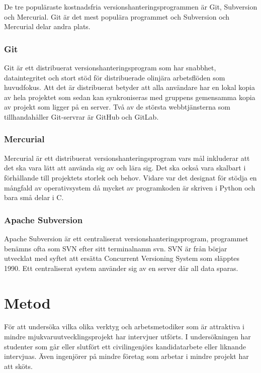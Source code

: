 De tre populäraste kostnadsfria versionshanteringsprogrammen är Git, Subversion och Mercurial. Git är det mest populära programmet och Subversion och Mercurial delar andra plats.\cite{version_comp}
\subsubsection{Git}
Git är ett distribuerat versionshanteringsprogram som har snabbhet, dataintegritet och stort stöd för distribuerade olinjära arbetsflöden som huvudfokus. Att det är distribuerat betyder att alla användare har en lokal kopia av hela projektet som sedan kan synkroniseras med gruppens gemensamma kopia av projekt som ligger på en server. Två av de största webbtjänsterna som tillhandahåller Git-servrar är GitHub och GitLab.\cite{VersionControlGit}\cite{web_Git}

\subsubsection{Mercurial}
Mercurial är ett distribuerat versionshanteringsprogram vars mål inkluderar att det ska vara lätt att använda sig av och lära sig. Det ska också vara skalbart i förhållande till projektets storlek och behov. Vidare var det designat för stödja en mångfald av operativsystem då mycket av programkoden är skriven i Python och bara små delar i C.
\cite{VersionControlMercurial}\cite{VersionControlMercurial}


\subsubsection{Apache Subversion}
Apache Subversion är ett centraliserat versionshanteringsprogram, programmet benämns ofta som SVN efter sitt terminalnamn svn. SVN är från börjar utvecklat med syftet att ersätta Concurrent Versioning System som släpptes 1990. Ett centraliserat system använder sig av en server där all data sparas.\cite{wiki_cvs}\cite{VersionControlSvn}\cite{web_Svn}


\section{Metod}
För att undersöka vilka olika verktyg och arbetsmetodiker som är attraktiva i mindre mjukvaruutvecklingsprojekt har intervjuer utförts. I undersökningen har studenter som går eller slutfört ett civilingenjörs kandidatarbete eller liknande intervjuas. Även ingenjörer på mindre företag som arbetar i mindre projekt har att sköts.

